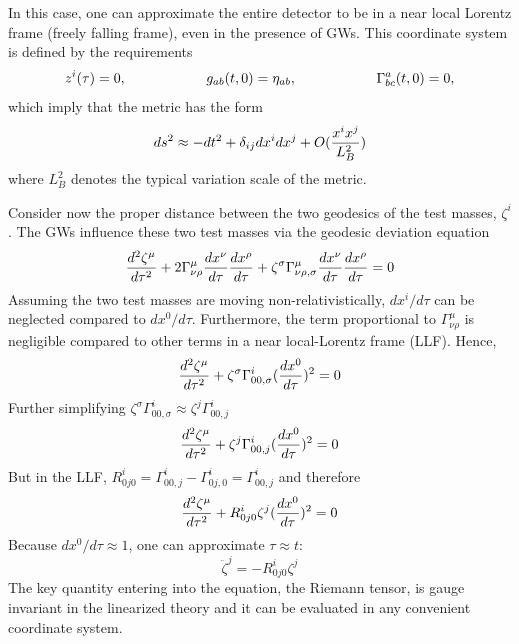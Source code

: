 \documentclass[binding=0.6cm, LaM]{sapthesis}
\begin{document}
        In this case, one can approximate the entire detector to be in a near local Lorentz frame
        (freely falling frame), even in the presence of GWs. This coordinate system is defined by the requirements
        \begin{equation}
          z^i(\tau) = 0, \hspace*{2cm} g_{ab}(t, 0) = \eta_{ab}, \hspace*{2cm} \Gamma^a_{bc}(t,0) = 0,
        \end{equation}
        which imply that the metric has the form
        \begin{equation}
          ds^2 \approx -dt^2 + \delta_{ij}dx^i dx^j + O({{x^ix^j}\over{L^2_B}})
        \end{equation}
        where $L^2_B$ denotes the typical variation scale of the metric.

        Consider now the proper distance between the two geodesics of the test masses, $\zeta^i$.
        The GWs influence these two test masses via the geodesic deviation equation
        \begin{equation}
          {{d^2\zeta^{\mu}}\over{d\tau^2}} + 2\Gamma^{\mu}_{\nu\rho}{{dx^{\nu}}\over{d\tau}}{{dx^\rho}\over{d\tau}} + \zeta^{\sigma}\Gamma^{\mu}_{\nu\rho,\sigma}{{dx^{\nu}}\over{d\tau}}{{dx^{\rho}}\over{d\tau}} = 0
        \end{equation}
        Assuming the two test masses are moving non-relativistically, $dx^i/d\tau$ can be neglected compared to $dx^0/d\tau$.
        Furthermore, the term proportional to $\Gamma^{\mu}_{\nu\rho}$ is negligible compared to other terms in a near local-Lorentz frame (LLF). Hence,
        \begin{equation}
          {{d^2\zeta^{\mu}}\over{d\tau^2}} + \zeta^{\sigma}\Gamma^{i}_{00, \sigma}({{dx^0}\over{d\tau}})^2 = 0
        \end{equation}
        Further simplifying $\zeta^{\sigma}\Gamma^{i}_{00, \sigma} \approx \zeta^{j}\Gamma^{i}_{00, j}$
        \begin{equation}
          {{d^2\zeta^{\mu}}\over{d\tau^2}} + \zeta^{j}\Gamma^{i}_{00,j}({{dx^0}\over{d\tau}})^2 = 0
        \end{equation}
        But in the LLF, $R^i_{0j0} = \Gamma^i_{00,j} - \Gamma^i_{0j,0} = \Gamma^i_{00,j}$ and therefore
        \begin{equation}
          {{d^2\zeta^{\mu}}\over{d\tau^2}} + R^i_{0j0} \zeta^j({{dx^0}\over{d\tau}})^2 = 0
        \end{equation}
        Because $dx^0/d\tau \approx 1$, one can approximate $\tau \approx t$:
        \begin{equation}
          {\ddot \zeta}^j = - R^i_{0j0}\zeta^j
        \end{equation}
        The key quantity entering into the equation, the Riemann tensor, is gauge invariant in the linearized theory and
        it can be evaluated in any convenient coordinate system.
\end{document}
